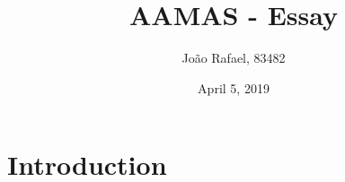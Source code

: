 \documentclass{article}
\title{\textbf{AAMAS - Essay}}
\author{\Large{João Rafael, 83482}}
\date{April 5, 2019}
\begin{document}
    \maketitle

    \section{Introduction}
\end{document}
